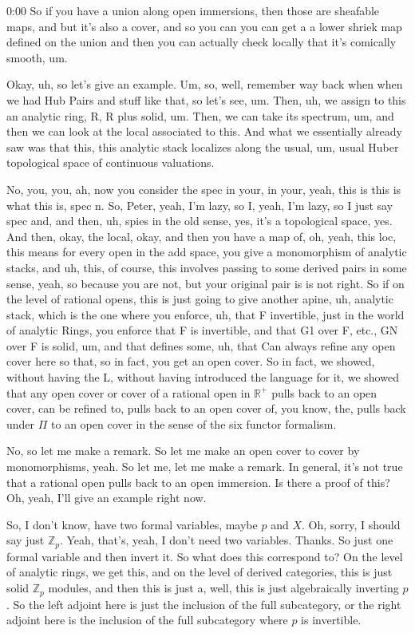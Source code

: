 \begin{unfinished}{0:00}
So if you have a union along open immersions, then those are sheafable maps, and but it's also a cover, and so you can you can get a a lower shriek map defined on the union and then you can actually check locally that it's comically smooth, um.

Okay, uh, so let's give an example. Um, so, well, remember way back when when we had Hub Pairs and stuff like that, so let's see, um. Then, uh, we assign to this an analytic ring, R, R plus solid, um. Then, we can take its spectrum, um, and then we can look at the local associated to this. And what we essentially already saw was that this, this analytic stack localizes along the usual, um, usual Huber topological space of continuous valuations.

No, you, you, ah, now you consider the spec in your, in your, yeah, this is this is what this is, spec n. So, Peter, yeah, I'm lazy, so I, yeah, I'm lazy, so I just say spec and, and then, uh, spies in the old sense, yes, it's a topological space, yes. And then, okay, the local, okay, and then you have a map of, oh, yeah, this loc, this means for every open in the add space, you give a monomorphism of analytic stacks, and uh, this, of course, this involves passing to some derived pairs in some sense, yeah, so because you are not, but your original pair is is not right. So if on the level of rational opens, this is just going to give another apine, uh, analytic stack, which is the one where you enforce, uh, that F invertible, just in the world of analytic Rings, you enforce that F is invertible, and that G1 over F, etc., GN over F is solid, um, and that defines some, uh, that
Can always refine any open cover here so that, so in fact, you get an open cover. So in fact, we showed, without having the L, without having introduced the language for it, we showed that any open cover or cover of a rational open in $\mathbb{R}^+$ pulls back to an open cover, can be refined to, pulls back to an open cover of, you know, the, pulls back under $\Pi$ to an open cover in the sense of the six functor formalism.

No, so let me make a remark. So let me make an open cover to cover by monomorphisms, yeah. So let me, let me make a remark. In general, it's not true that a rational open pulls back to an open immersion. Is there a proof of this? Oh, yeah, I'll give an example right now.

So, I don't know, have two formal variables, maybe $p$ and $X$. Oh, sorry, I should say just $\mathbb{Z}_p$. Yeah, that's, yeah, I don't need two variables. Thanks. So just one formal variable and then invert it. So what does this correspond to? On the level of analytic rings, we get this, and on the level of derived categories, this is just solid $\mathbb{Z}_p$ modules, and then this is just a, well, this is just algebraically inverting $p$. So the left adjoint here is just the inclusion of the full subcategory, or the right adjoint here is the inclusion of the full subcategory where $p$ is invertible.


\end{unfinished}
